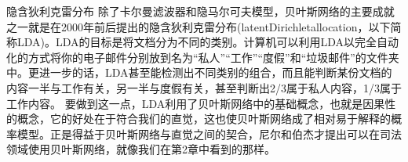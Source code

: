 隐含狄利克雷分布
除了卡尔曼滤波器和隐马尔可夫模型，贝叶斯网络的主要成就之一就是在2000年前后提出的隐含狄利克雷分布(latentDirichletallocation，以下简称LDA)。LDA的目标是将文档分为不同的类别。计算机可以利用LDA以完全自动化的方式将你的电子邮件分别放到名为“私人”“工作”“度假”和“垃圾邮件”的文件夹中。更进一步的话，LDA甚至能检测出不同类别的组合，而且能判断某份文档的内容一半与工作有关，另一半与度假有关，甚至判断出2/3属于私人内容，1/3属于工作内容。
要做到这一点，LDA利用了贝叶斯网络中的基础概念，也就是因果性的概念，它的好处在于符合我们的直觉，这也使贝叶斯网络成了相对易于解释的概率模型。正是得益于贝叶斯网络与直觉之间的契合，尼尔和伯杰才提出可以在司法领域使用贝叶斯网络，就像我们在第2章中看到的那样。
